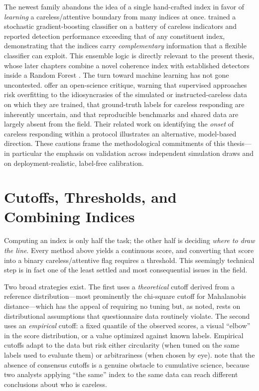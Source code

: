 The newest family abandons the idea of a single hand-crafted index in favor of
\emph{learning} a careless/attentive boundary from many indices at once.
\textcite{schroeders2022detecting} trained a stochastic gradient-boosting
classifier on a battery of careless indicators and reported detection
performance exceeding that of any constituent index, demonstrating that the
indices carry \emph{complementary} information that a flexible classifier can
exploit. This ensemble logic is directly relevant to the present thesis, whose
later chapters combine a novel coherence index with established detectors inside
a Random Forest \parencite{breiman2001random}. The turn toward machine learning
has not gone uncontested. \textcite{alfons2024openscience} offer an
open-science critique, warning that supervised approaches risk overfitting to
the idiosyncrasies of the simulated or instructed-careless data on which they
are trained, that ground-truth labels for careless responding are inherently
uncertain, and that reproducible benchmarks and shared data are largely absent
from the field. Their related work on identifying the \emph{onset} of careless
responding within a protocol \parencite{welz2023onset} illustrates an
alternative, model-based direction. These cautions frame the methodological
commitments of this thesis---in particular the emphasis on validation across
independent simulation draws and on deployment-realistic, label-free
calibration.

\section{Cutoffs, Thresholds, and Combining Indices}

Computing an index is only half the task; the other half is deciding \emph{where
to draw the line}. Every method above yields a continuous score, and converting
that score into a binary careless/attentive flag requires a threshold. This
seemingly technical step is in fact one of the least settled and most
consequential issues in the field.

Two broad strategies exist. The first uses a \emph{theoretical} cutoff derived
from a reference distribution---most prominently the chi-square cutoff for
Mahalanobis distance---which has the appeal of requiring no tuning but, as
noted, rests on distributional assumptions that questionnaire data routinely
violate. The second uses an \emph{empirical} cutoff: a fixed quantile of the
observed scores, a visual ``elbow'' in the score distribution, or a value
optimized against known labels. Empirical cutoffs adapt to the data but risk
either circularity (when tuned on the same labels used to evaluate them) or
arbitrariness (when chosen by eye). \textcite{ward2023dealing} note that the
absence of consensus cutoffs is a genuine obstacle to cumulative science,
because two analysts applying ``the same'' index to the same data can reach
different conclusions about who is careless.

